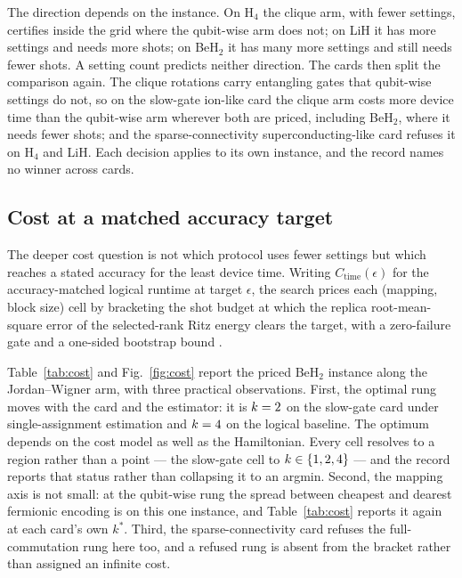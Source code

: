 \documentclass[aps,pra,reprint,superscriptaddress,nofootinbib,floatfix,
  showkeys]{revtex4-2}
\newcommand{\Ctime}{C_{\mathrm{time}}(\epsilon)}
\begin{document}
The direction depends on the instance.  On H$_4$ the clique arm, with fewer
settings, certifies inside the grid where the qubit-wise arm does not; on LiH it
has more settings and needs more shots; on BeH$_2$ it has many more settings and
still needs fewer shots.  A setting count predicts neither direction.  The cards
then split the comparison again.  The clique rotations carry entangling gates
that qubit-wise settings do not, so on the slow-gate ion-like card the clique
arm costs more device time than the qubit-wise arm wherever both are priced,
including BeH$_2$, where it needs fewer shots; and the sparse-connectivity
superconducting-like card refuses it on H$_4$ and LiH.  Each decision applies
to its own instance, and the record names no winner across cards.

\subsection{Cost at a matched accuracy target}

The deeper cost question is not which protocol uses fewer settings but which
reaches a stated accuracy for the least device time.  Writing $\Ctime$ for the
accuracy-matched logical runtime at target $\epsilon$, the search prices each
(mapping, block size) cell by bracketing the shot budget at which the replica
root-mean-square error of the selected-rank Ritz energy clears the target, with
a zero-failure gate and a one-sided bootstrap bound \cite{efron1979bootstrap}.

Table~\ref{tab:cost} and Fig.~\ref{fig:cost} report the priced BeH$_2$ instance
along the Jordan--Wigner arm, with three practical observations.  First,
the optimal rung moves with the card and the estimator: it is $k=2{}$
on the slow-gate card under single-assignment estimation and
$k=4{}$ on the logical baseline.  The optimum depends on the cost model as well as the Hamiltonian.  Every cell resolves to a
region rather than a point --- the slow-gate cell to $k \in
\{1, 2, 4\}$ --- and the record reports that status rather than
collapsing it to an argmin.  Second, the mapping axis is not small: at the
qubit-wise rung the spread between cheapest and dearest fermionic encoding is
\cqcMappingSpreadKOne{} on this one instance, and Table~\ref{tab:cost} reports
it again at each card's own $k^*$.  Third, the sparse-connectivity card refuses
the full-commutation rung here too, and a refused rung is absent from the
bracket rather than assigned an infinite cost.
\end{document}
